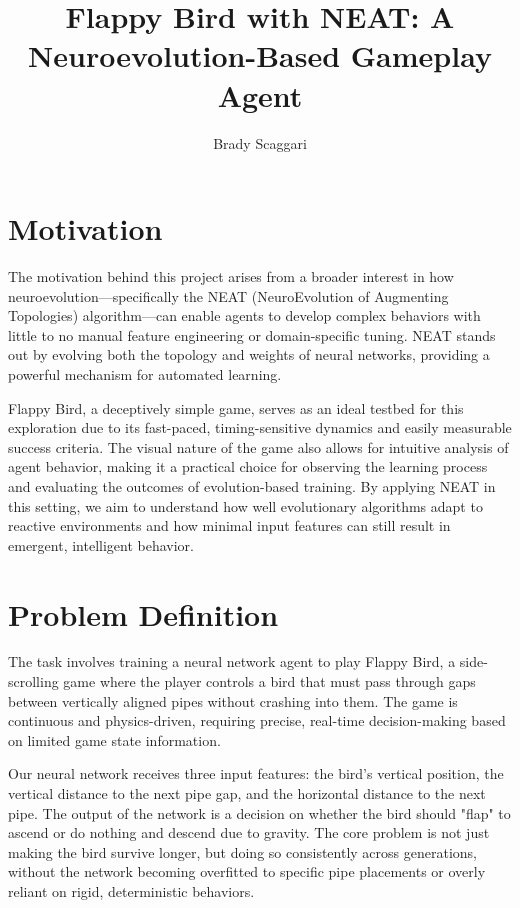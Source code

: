 \documentclass[sigconf]{acmart}
\title{Flappy Bird with NEAT: A Neuroevolution-Based Gameplay Agent}
\author{Brady Scaggari}
\begin{document}
\maketitle

\section{Motivation}
The motivation behind this project arises from a broader interest in how neuroevolution—specifically the NEAT (NeuroEvolution of Augmenting Topologies) algorithm—can enable agents to develop complex behaviors with little to no manual feature engineering or domain-specific tuning. NEAT stands out by evolving both the topology and weights of neural networks, providing a powerful mechanism for automated learning.

Flappy Bird, a deceptively simple game, serves as an ideal testbed for this exploration due to its fast-paced, timing-sensitive dynamics and easily measurable success criteria. The visual nature of the game also allows for intuitive analysis of agent behavior, making it a practical choice for observing the learning process and evaluating the outcomes of evolution-based training. By applying NEAT in this setting, we aim to understand how well evolutionary algorithms adapt to reactive environments and how minimal input features can still result in emergent, intelligent behavior.

\section{Problem Definition}
The task involves training a neural network agent to play Flappy Bird, a side-scrolling game where the player controls a bird that must pass through gaps between vertically aligned pipes without crashing into them. The game is continuous and physics-driven, requiring precise, real-time decision-making based on limited game state information.

Our neural network receives three input features: the bird's vertical position, the vertical distance to the next pipe gap, and the horizontal distance to the next pipe. The output of the network is a decision on whether the bird should "flap" to ascend or do nothing and descend due to gravity. The core problem is not just making the bird survive longer, but doing so consistently across generations, without the network becoming overfitted to specific pipe placements or overly reliant on rigid, deterministic behaviors.
\end{document}
